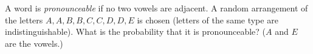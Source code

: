 A word is \emph{pronounceable} if no two vowels are adjacent. A random arrangement of the letters $A,A,B,B,C,C,D,D,E$ is chosen (letters of the same type are indistinguishable). What is the probability that it is pronounceable? ($A$ and $E$ are the vowels.)

